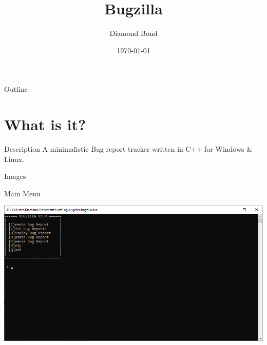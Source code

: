 \documentclass[bigger]{beamer}
\author{Diamond Bond}
\date{\today}
\title{Bugzilla}
\begin{document}
\maketitle
\begin{frame}{Outline}
\tableofcontents
\end{frame}


\section{What is it?}
\label{sec:org4eaae33}
\begin{frame}[label={sec:org1d27ef0}]{Description}
A minimalistic Bug report tracker written in C++ for Windows \& Linux.
\end{frame}

\begin{frame}[label={sec:org2f5754b}]{Images}
\begin{block}{Main Menu}
\begin{center}
\includegraphics[width=.9\linewidth]{../img/mainmenu.png}
\end{center}
\end{block}
\end{frame}
\end{document}
